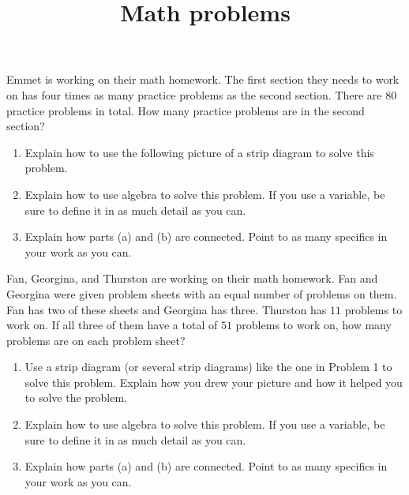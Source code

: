 \documentclass[nooutcomes,noauthor,handout]{ximera}
\title{Math problems}
\begin{document}
\begin{abstract}
\end{abstract}

\maketitle

\begin{problem}
Emmet is working on their math homework. The first section they needs to work on has four times as many practice problems as the second section. There are $80$ practice problems in total. How many practice problems are in the second section?

\begin{enumerate}
	\item Explain how to use the following picture of a strip diagram to solve this problem.
	\begin{image} \end{image}
	\item Explain how to use algebra to solve this problem. If you use a variable, be sure to define it in as much detail as you can.
	\item Explain how parts (a) and (b) are connected. Point to as many specifics in your work as you can.
\end{enumerate}

\end{problem}



\begin{problem}
Fan, Georgina, and Thurston are working on their math homework. Fan and Georgina were given problem sheets with an equal number of problems on them. Fan has two of these sheets and Georgina has three. Thurston has $11$ problems to work on. If all three of them have a total of $51$ problems to work on, how many problems are on each problem sheet?

\begin{enumerate}
	\item Use a strip diagram (or several strip diagrams) like the one in Problem 1 to solve this problem. Explain how you drew your picture and how it helped you to solve the problem.
	\item Explain how to use algebra to solve this problem. If you use a variable, be sure to define it in as much detail as you can.
	\item Explain how parts (a) and (b) are connected. Point to as many specifics in your work as you can.
\end{enumerate}
\end{problem}
\end{document}
